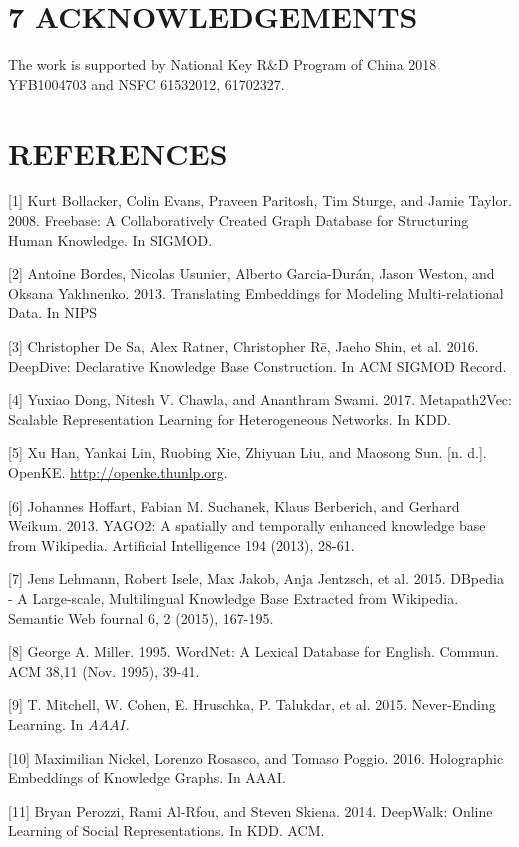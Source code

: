 \documentclass[10pt]{article}
\begin{document}
\section*{7 ACKNOWLEDGEMENTS}
The work is supported by National Key R\&D Program of China 2018 YFB1004703 and NSFC 61532012, 61702327.

\section*{REFERENCES}
[1] Kurt Bollacker, Colin Evans, Praveen Paritosh, Tim Sturge, and Jamie Taylor. 2008. Freebase: A Collaboratively Created Graph Database for Structuring Human Knowledge. In SIGMOD.

[2] Antoine Bordes, Nicolas Usunier, Alberto Garcia-Durán, Jason Weston, and Oksana Yakhnenko. 2013. Translating Embeddings for Modeling Multi-relational Data. In NIPS

[3] Christopher De Sa, Alex Ratner, Christopher Rē, Jaeho Shin, et al. 2016. DeepDive: Declarative Knowledge Base Construction. In ACM SIGMOD Record.

[4] Yuxiao Dong, Nitesh V. Chawla, and Ananthram Swami. 2017. Metapath2Vec: Scalable Representation Learning for Heterogeneous Networks. In KDD.

[5] Xu Han, Yankai Lin, Ruobing Xie, Zhiyuan Liu, and Maosong Sun. [n. d.]. OpenKE. \href{http://openke.thunlp.org}{http://openke.thunlp.org}.

[6] Johannes Hoffart, Fabian M. Suchanek, Klaus Berberich, and Gerhard Weikum. 2013. YAGO2: A spatially and temporally enhanced knowledge base from Wikipedia. Artificial Intelligence 194 (2013), 28-61.

[7] Jens Lehmann, Robert Isele, Max Jakob, Anja Jentzsch, et al. 2015. DBpedia - A Large-scale, Multilingual Knowledge Base Extracted from Wikipedia. Semantic Web fournal 6, 2 (2015), 167-195.

[8] George A. Miller. 1995. WordNet: A Lexical Database for English. Commun. ACM 38,11 (Nov. 1995), 39-41.

[9] T. Mitchell, W. Cohen, E. Hruschka, P. Talukdar, et al. 2015. Never-Ending Learning. In $A A A I$.

[10] Maximilian Nickel, Lorenzo Rosasco, and Tomaso Poggio. 2016. Holographic Embeddings of Knowledge Graphs. In AAAI.

[11] Bryan Perozzi, Rami Al-Rfou, and Steven Skiena. 2014. DeepWalk: Online Learning of Social Representations. In KDD. ACM.
\end{document}
